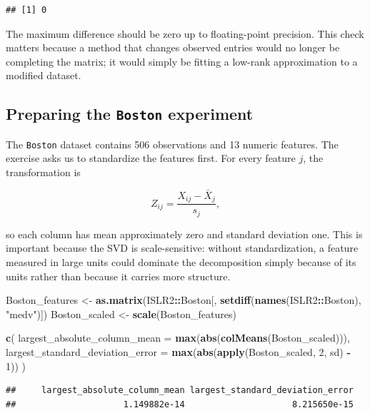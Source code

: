 \documentclass[
  11pt,
]{article}
\newenvironment{Shaded}{\begin{snugshade}}{\end{snugshade}}
\newcommand{\AttributeTok}[1]{\textcolor[rgb]{0.13,0.29,0.53}{#1}}
\newcommand{\DecValTok}[1]{\textcolor[rgb]{0.00,0.00,0.81}{#1}}
\newcommand{\FunctionTok}[1]{\textcolor[rgb]{0.13,0.29,0.53}{\textbf{#1}}}
\newcommand{\NormalTok}[1]{#1}
\newcommand{\OtherTok}[1]{\textcolor[rgb]{0.56,0.35,0.01}{#1}}
\newcommand{\SpecialCharTok}[1]{\textcolor[rgb]{0.81,0.36,0.00}{\textbf{#1}}}
\newcommand{\StringTok}[1]{\textcolor[rgb]{0.31,0.60,0.02}{#1}}
\begin{document}
\begin{verbatim}
## [1] 0
\end{verbatim}

The maximum difference should be zero up to floating-point precision.
This check matters because a method that changes observed entries would
no longer be completing the matrix; it would simply be fitting a
low-rank approximation to a modified dataset.

\subsection{\texorpdfstring{Preparing the \texttt{Boston}
experiment}{Preparing the Boston experiment}}\label{preparing-the-boston-experiment}

The \texttt{Boston} dataset contains 506 observations and 13 numeric
features. The exercise asks us to standardize the features first. For
every feature \(j\), the transformation is

\[
Z_{ij} = \frac{X_{ij}-\bar X_j}{s_j},
\]

so each column has mean approximately zero and standard deviation one.
This is important because the SVD is scale-sensitive: without
standardization, a feature measured in large units could dominate the
decomposition simply because of its units rather than because it carries
more structure.

\begin{Shaded}
\begin{Highlighting}[]
\NormalTok{Boston\_features }\OtherTok{\textless{}{-}} \FunctionTok{as.matrix}\NormalTok{(ISLR2}\SpecialCharTok{::}\NormalTok{Boston[, }\FunctionTok{setdiff}\NormalTok{(}\FunctionTok{names}\NormalTok{(ISLR2}\SpecialCharTok{::}\NormalTok{Boston), }\StringTok{"medv"}\NormalTok{)])}
\NormalTok{Boston\_scaled }\OtherTok{\textless{}{-}} \FunctionTok{scale}\NormalTok{(Boston\_features)}

\FunctionTok{c}\NormalTok{(}
  \AttributeTok{largest\_absolute\_column\_mean =} \FunctionTok{max}\NormalTok{(}\FunctionTok{abs}\NormalTok{(}\FunctionTok{colMeans}\NormalTok{(Boston\_scaled))),}
  \AttributeTok{largest\_standard\_deviation\_error =} \FunctionTok{max}\NormalTok{(}\FunctionTok{abs}\NormalTok{(}\FunctionTok{apply}\NormalTok{(Boston\_scaled, }\DecValTok{2}\NormalTok{, sd) }\SpecialCharTok{{-}} \DecValTok{1}\NormalTok{))}
\NormalTok{)}
\end{Highlighting}
\end{Shaded}

\begin{verbatim}
##     largest_absolute_column_mean largest_standard_deviation_error 
##                     1.149882e-14                     8.215650e-15
\end{verbatim}
\end{document}
